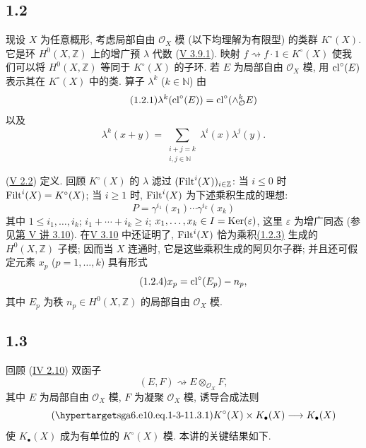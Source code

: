 \subsection*{1.2} 现设 $X$ 为任意概形, 考虑局部自由 $\mathcal O_X$ 模 (以下均理解为有限型) 的类群 $K^\circ(X)$. 它是环 $H^0(X,\mathbb Z)$ 上的增广预 $\lambda$ 代数 (\hyperlink{sga6.e05.ex.3-9-1}{V 3.9.1}). 映射 $f\rightsquigarrow f\cdot1\in K^\circ(X)$ 使我们可以将 $H^0(X,\mathbb Z)$ 等同于 $K^\circ(X)$ 的子环. 若 $E$ 为局部自由 $\mathcal O_X$ 模, 用 $\operatorname{cl}^\circ(E)$ 表示其在 $K^\circ(X)$ 中的类. 算子 $\lambda^k$ ($k\in\mathbb N$) 由
%
%
%
%
%
%
%
%
\begin{equation}\tag{1.2.1}
\lambda^k(\operatorname{cl}^\circ(E))=\operatorname{cl}^\circ(\wedge_{\mathcal O}^kE)
\end{equation}
以及
\begin{equation}\tag{1.2.2}
\lambda^k(x+y)=
\sum_{\substack{i+j=k\\ i,j\in\mathbb N}}\lambda^i(x)\lambda^j(y).
\end{equation}

(\hyperlink{sga6.e05.ex.2-2}{V 2.2}) 定义. 回顾 $K^\circ(X)$ 的 $\lambda$ 滤过 $(\operatorname{Filt}^i(X))_{i\in\mathbb Z}$: 当 $i\leq0$ 时 $\operatorname{Filt}^i(X)=K^\circ(X)$; 当 $i\geq1$ 时, $\operatorname{Filt}^i(X)$ 为下述乘积生成的理想:
%
%
%
\begin{equation}\tag{1.2.3}
P=\gamma^{i_1}(x_1)\cdots\gamma^{i_k}(x_k)
\end{equation}
其中 $1\leq i_1,\ldots,i_k$; $i_1+\cdots+i_k\geq i$; $x_1,\ldots,x_k\in I=\operatorname{Ker}(\varepsilon)$, 这里 $\varepsilon$ 为增广同态 (参见\hyperlink{sga6.e05.para.3-10}{第 V 讲 3.10}). 在\hyperlink{sga6.e05.para.3-10}{V 3.10} 中还证明了, $\operatorname{Filt}^i(X)$ 恰为乘积\hyperlink{sga6.e10.eq.1-2-3}{(1.2.3)} 生成的 $H^0(X,\mathbb Z)$ 子模; 因而当 $X$ 连通时, 它是这些乘积生成的阿贝尔子群; 并且还可假定元素 $x_p$ ($p=1,\ldots,k$) 具有形式
%
%
%
%
%
\begin{equation}\tag{1.2.4}
x_p=\operatorname{cl}^\circ(E_p)-n_p,
\end{equation}
其中 $E_p$ 为秩 $n_p\in H^0(X,\mathbb Z)$ 的局部自由 $\mathcal O_X$ 模.
%

\subsection*{1.3} 回顾 (\hyperlink{sga6.e04.para.2-10}{IV 2.10}) 双函子
%
\[
(E,F)\rightsquigarrow E\otimes_{\mathcal O_X}F,
\]
其中 $E$ 为局部自由 $\mathcal O_X$ 模, $F$ 为凝聚 $\mathcal O_X$ 模, 诱导合成法则
%
\begin{equation}\tag{\sgaStableTargetInline{sga6.e10.eq.1-3-1}1.3.1}
K^\circ(X)\times K_\bullet(X)\longrightarrow K_\bullet(X)
\end{equation}
使 $K_\bullet(X)$ 成为有单位的 $K^\circ(X)$ 模. 本讲的关键结果如下.
%


